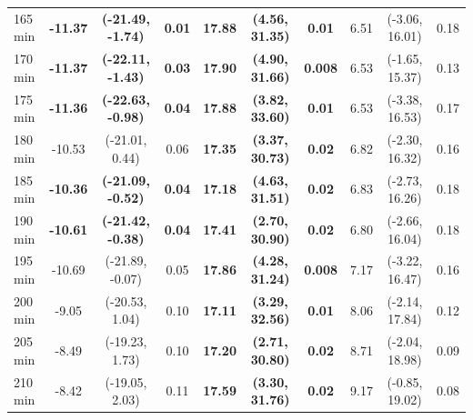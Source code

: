 \begin{table}[ht]
{\begin{tabular}{lccccccccc}
165 min & \textbf{-11.37} & \textbf{(-21.49, -1.74)} & \textbf{0.01} & \textbf{17.88} & \textbf{(4.56, 31.35)} & \textbf{0.01} & 6.51 & (-3.06, 16.01) & 0.18 \\
170 min & \textbf{-11.37} & \textbf{(-22.11, -1.43)} & \textbf{0.03} & \textbf{17.90} & \textbf{(4.90, 31.66)} & \textbf{0.008} & 6.53 & (-1.65, 15.37) & 0.13 \\
175 min & \textbf{-11.36} & \textbf{(-22.63, -0.98)} & \textbf{0.04} & \textbf{17.88} & \textbf{(3.82, 33.60)} & \textbf{0.01} & 6.53 & (-3.38, 16.53) & 0.17 \\
180 min & -10.53 & (-21.01, 0.44) & 0.06 & \textbf{17.35} & \textbf{(3.37, 30.73)} & \textbf{0.02} & 6.82 & (-2.30, 16.32) & 0.16 \\
185 min & \textbf{-10.36} & \textbf{(-21.09, -0.52)} & \textbf{0.04} & \textbf{17.18} & \textbf{(4.63, 31.51)} & \textbf{0.02} & 6.83 & (-2.73, 16.26) & 0.18 \\
190 min & \textbf{-10.61} & \textbf{(-21.42, -0.38)} & \textbf{0.04} & \textbf{17.41} & \textbf{(2.70, 30.90)} & \textbf{0.02} & 6.80 & (-2.66, 16.04) & 0.18 \\
195 min & -10.69 & (-21.89, -0.07) & 0.05 & \textbf{17.86} & \textbf{(4.28, 31.24)} & \textbf{0.008} & 7.17 & (-3.22, 16.47) & 0.16 \\
200 min & -9.05 & (-20.53, 1.04) & 0.10 & \textbf{17.11} & \textbf{(3.29, 32.56)} & \textbf{0.01} & 8.06 & (-2.14, 17.84) & 0.12 \\
205 min & -8.49 & (-19.23, 1.73) & 0.10 & \textbf{17.20} & \textbf{(2.71, 30.80)} & \textbf{0.02} & 8.71 & (-2.04, 18.98) & 0.09 \\
210 min & -8.42 & (-19.05, 2.03) & 0.11 & \textbf{17.59} & \textbf{(3.30, 31.76)} & \textbf{0.02} & 9.17 & (-0.85, 19.02) & 0.08 \\
\bottomrule
\end{tabular}%
}
\end{table}
